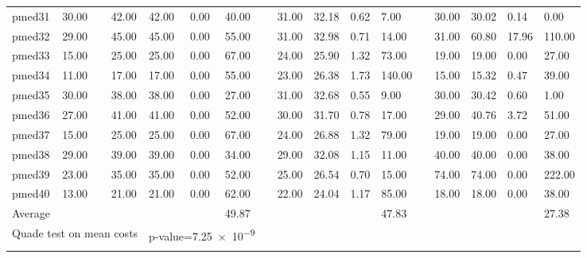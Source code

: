 \begin{table}[H]
\begin{tabularx}{\textwidth}{XXlXXXXlXXXXlXXXX}
    pmed31 & 30.00 && 42.00 & 42.00 & 0.00 & 40.00 && 31.00 & 32.18 & 0.62 & 7.00 && 30.00 & 30.02 & 0.14 & 0.00\\
    pmed32 & 29.00 && 45.00 & 45.00 & 0.00 & 55.00 && 31.00 & 32.98 & 0.71 & 14.00 && 31.00 & 60.80 & 17.96 & 110.00\\
    pmed33 & 15.00 && 25.00 & 25.00 & 0.00 & 67.00 && 24.00 & 25.90 & 1.32 & 73.00 && 19.00 & 19.00 & 0.00 & 27.00\\
    pmed34 & 11.00 && 17.00 & 17.00 & 0.00 & 55.00 && 23.00 & 26.38 & 1.73 & 140.00 && 15.00 & 15.32 & 0.47 & 39.00\\
    pmed35 & 30.00 && 38.00 & 38.00 & 0.00 & 27.00 && 31.00 & 32.68 & 0.55 & 9.00 && 30.00 & 30.42 & 0.60 & 1.00\\
    pmed36 & 27.00 && 41.00 & 41.00 & 0.00 & 52.00 && 30.00 & 31.70 & 0.78 & 17.00 && 29.00 & 40.76 & 3.72 & 51.00\\
    pmed37 & 15.00 && 25.00 & 25.00 & 0.00 & 67.00 && 24.00 & 26.88 & 1.32 & 79.00 && 19.00 & 19.00 & 0.00 & 27.00\\
    pmed38 & 29.00 && 39.00 & 39.00 & 0.00 & 34.00 && 29.00 & 32.08 & 1.15 & 11.00 && 40.00 & 40.00 & 0.00 & 38.00\\
    pmed39 & 23.00 && 35.00 & 35.00 & 0.00 & 52.00 && 25.00 & 26.54 & 0.70 & 15.00 && 74.00 & 74.00 & 0.00 & 222.00\\
    pmed40 & 13.00 && 21.00 & 21.00 & 0.00 & 62.00 && 22.00 & 24.04 & 1.17 & 85.00 && 18.00 & 18.00 & 0.00 & 38.00\\
    \hline
    \multicolumn{2}{l}{Average} &&&&& 49.87 &&&&& 47.83 &&&&& 27.38\\
    \hline
    \multicolumn{4}{r}{Quade test on mean costs} & \multicolumn{3}{l}{p-value=\num{7.25e-9}} & \multicolumn{10}{c}{}\\
    \lasthline
    \end{tabularx}
    \normalsize
\end{table}
